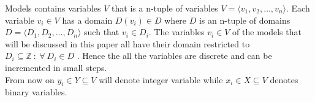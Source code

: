 Models contains variables $V$ that is a n-tuple of variables $V = \langle v_1, v_2, \dots , v_n \rangle $. Each 
variable $v_i \in V$ has a domain $D(v_i) \in D$ where $D$ is an n-tuple of domains $D = \langle D_1, D_2, \dots , D_n 
\rangle $ such that $v_i \in D_i$. The variables $v_i \in V$ of the models that will be discussed in this paper all 
have their domain restricted to $D_i \subseteq \mathbb{Z}\ : \: \forall \ D_i \in D$ . Hence the all the variables are discrete and can be incremented in small steps. \\
From now on $y_i \in Y \subseteq V$ will denote integer variable while $x_i \in X \subseteq V$ 
denotes binary variables. 